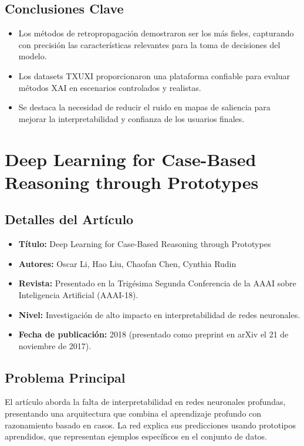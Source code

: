 \documentclass{report}
\begin{document}
\subsection{Conclusiones Clave}
\begin{itemize}
    \item Los métodos de retropropagación demostraron ser los más fieles, capturando con precisión las características relevantes para la toma de decisiones del modelo.
    \item Los datasets TXUXI proporcionaron una plataforma confiable para evaluar métodos XAI en escenarios controlados y realistas.
    \item Se destaca la necesidad de reducir el ruido en mapas de saliencia para mejorar la interpretabilidad y confianza de los usuarios finales.
\end{itemize}


\section{Deep Learning for Case-Based Reasoning through Prototypes}

    \subsection{Detalles del Artículo}
    \begin{itemize}
        \item \textbf{Título:} Deep Learning for Case-Based Reasoning through Prototypes
        \item \textbf{Autores:} Oscar Li, Hao Liu, Chaofan Chen, Cynthia Rudin
        \item \textbf{Revista:} Presentado en la Trigésima Segunda Conferencia de la AAAI sobre Inteligencia Artificial (AAAI-18).
        \item \textbf{Nivel:} Investigación de alto impacto en interpretabilidad de redes neuronales.
        \item \textbf{Fecha de publicación:} 2018 (presentado como preprint en arXiv el 21 de noviembre de 2017).
    \end{itemize}

    \subsection{Problema Principal}
    El artículo aborda la falta de interpretabilidad en redes neuronales profundas, presentando una arquitectura que combina el aprendizaje profundo con razonamiento basado en casos. La red explica sus predicciones usando prototipos aprendidos, que representan ejemplos específicos en el conjunto de datos.
\end{document}
